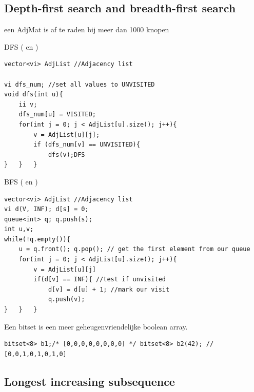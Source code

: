 \documentclass[10pt,a4paper,titlepage]{article}
\DeclareMathOperator{\bigO}{\mathcal{O}}
\begin{document}
\subsection{Depth-first search and breadth-first search}

een AdjMat is af te raden bij meer dan 1000 knopen

DFS (\bigO{V+E} en \bigO{V^2})
\begin{lstlisting}
vector<vi> AdjList //Adjacency list

vi dfs_num; //set all values to UNVISITED
void dfs(int u){
	ii v;
	dfs_num[u] = VISITED;
	for(int j = 0; j < AdjList[u].size(); j++){
		v = AdjList[u][j];
		if (dfs_num[v] == UNVISITED){
			dfs(v);DFS
}	}	}
\end{lstlisting}

BFS (\bigO{V+E} en \bigO{V^2})

\begin{lstlisting}
vector<vi> AdjList //Adjacency list
vi d(V, INF); d[s] = 0;
queue<int> q; q.push(s);
int u,v;
while(!q.empty()){
	u = q.front(); q.pop(); // get the first element from our queue
	for(int j = 0; j < AdjList[u].size(); j++){
		v = AdjList[u][j]
		if(d[v] == INF){ //test if unvisited
			d[v] = d[u] + 1; //mark our visit
			q.push(v);
}	}	}
\end{lstlisting}

Een bitset is een meer geheugenvriendelijke boolean array.
\begin{lstlisting}
bitset<8> b1;/* [0,0,0,0,0,0,0,0] */ bitset<8> b2(42); // [0,0,1,0,1,0,1,0] 
\end{lstlisting}

\subsection{Longest increasing subsequence}


\iftrue
\end{document}
